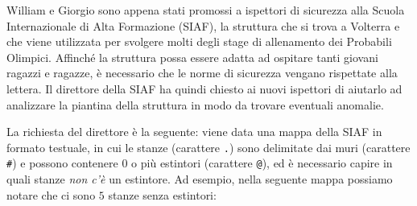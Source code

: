 \usepackage{xcolor}
\usepackage{afterpage}
\usepackage{pifont,mdframed}
\usepackage[bottom]{footmisc}
\usepackage{multicol}

\makeatletter
\gdef\this@inputfilename{input.txt}
\gdef\this@outputfilename{output.txt}
\makeatother

\newcommand{\inputfile}{\texttt{input.txt}}
\newcommand{\outputfile}{\texttt{output.txt}}

\newenvironment{warning}
  {\par\begin{mdframed}[linewidth=2pt,linecolor=gray]%
    \begin{list}{}{\leftmargin=1cm
                   \labelwidth=\leftmargin}\item[\Large\ding{43}]}
  {\end{list}\end{mdframed}\par}

William e Giorgio sono appena stati promossi a ispettori di sicurezza alla Scuola Internazionale di Alta Formazione (SIAF), la struttura che si trova a Volterra e che viene utilizzata per svolgere molti degli stage di allenamento dei Probabili Olimpici. Affinché la struttura possa essere adatta ad ospitare tanti giovani ragazzi e ragazze, è necessario che le norme di sicurezza vengano rispettate alla lettera. Il direttore della SIAF ha quindi chiesto ai nuovi ispettori di aiutarlo ad analizzare la piantina della struttura in modo da trovare eventuali anomalie.

La richiesta del direttore è la seguente: viene data una mappa della SIAF in formato testuale, in cui le stanze (carattere \texttt{.}) sono delimitate dai muri (carattere \texttt{\#}) e possono contenere $0$ o più estintori (carattere \texttt{@}), ed è necessario capire in quali stanze \emph{non c'è} un estintore. Ad esempio, nella seguente mappa possiamo notare che ci sono $5$ stanze senza estintori:

\vspace{0.3cm}

\setlength\columnsep{50pt}

